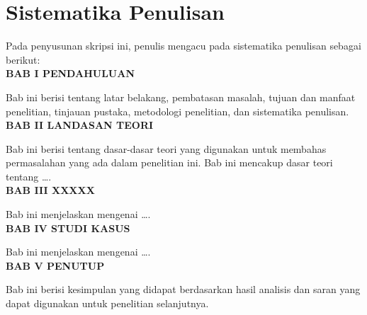 \section{Sistematika Penulisan}
Pada penyusunan skripsi ini, penulis mengacu pada sistematika penulisan sebagai berikut:\\
\newline \textbf{BAB I PENDAHULUAN}
\par Bab ini berisi tentang latar belakang, pembatasan masalah, tujuan dan manfaat penelitian, tinjauan pustaka, metodologi penelitian, dan sistematika penulisan.\\
\newline \textbf{BAB II LANDASAN TEORI}
\par Bab ini berisi tentang dasar-dasar teori yang digunakan untuk membahas permasalahan yang ada dalam penelitian ini. Bab ini mencakup dasar teori tentang \ldots.\\
\newline \textbf{BAB III XXXXX}
\par Bab ini menjelaskan mengenai \ldots.\\
\newline \textbf{BAB IV STUDI KASUS}
\par Bab ini menjelaskan mengenai \ldots.\\
\newline \textbf{BAB V PENUTUP}
\par Bab ini berisi kesimpulan yang didapat berdasarkan hasil analisis dan saran yang dapat digunakan untuk penelitian selanjutnya.

